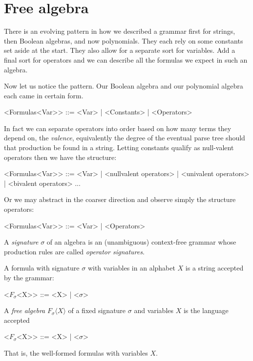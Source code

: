 \section{Free algebra}
There is an evolving pattern in how we described a grammar first for strings, 
then Boolean algebras, and now polynomials.  They each rely on some 
constants set aside at the start.  They also allow for a separate sort for
variables.  Add a final sort for operators and we can describe all the formulas 
we expect in such an algebra.

Now let us notice the pattern.  Our Boolean algebra and our polynomial algebra each 
came in certain form.
\begin{Gcode}[]
    <Formulas<Var>> ::= <Var>
            | <Constants>
            | <Operators>
\end{Gcode}
In fact we can separate operators into order based on how many terms they depend on,
the \emph{valence}, equivalently the degree of the eventual parse tree should that 
production be found in a string.  Letting constants qualify as null-valent operators 
then we have the structure:
\begin{Gcode}[]
    <Formulas<Var>> ::= <Var>
            | <nullvalent operators>
            | <univalent operators>
            | <bivalent operators>
            ...
\end{Gcode}
Or we may abstract in the coarser direction and observe simply the structure operators:
\begin{Gcode}[]
    <Formulas<Var>> ::= <Var>
                      | <Operators>
\end{Gcode}

\begin{definition}
    A \emph{signature} $\sigma$ of an algebra is an (unambiguous) context-free grammar 
    whose production rules are called \emph{operator signatures}.

    A formula with signature $\sigma$ with variables in an alphabet $X$
    is a string accepted by the grammar:
    \begin{Gcode}[]
        <$F_{\sigma}$<X>> ::= <X> | <$\sigma$>
    \end{Gcode}
\end{definition}


\begin{definition}
    A \emph{free algebra} $F_{\sigma}\langle X\rangle$ 
    of a fixed signature $\sigma$ and variables $X$
    is the language accepted 
    \begin{Gcode}[]
        <$F_{\sigma}$<X>> ::= <X> | <$\sigma$>
    \end{Gcode}
    That is, the well-formed formulas with variables $X$.
\end{definition}
